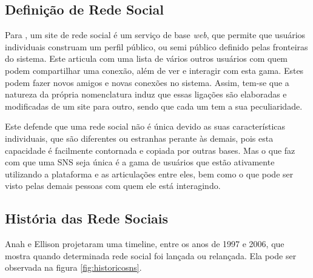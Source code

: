 \subsection{Definição de Rede Social}


\label{sec:definicao}
Para \cite{socialnetworkdefinition}, um site de rede social é um serviço
de base \textit{web}, que permite que usuários individuais construam um perfil público, ou
semi público definido pelas fronteiras do sistema. Este articula com uma lista de
vários outros usuários com quem podem compartilhar uma conexão, além de ver e
interagir com esta gama. Estes podem fazer novos amigos e novas conexões no sistema.
Assim, tem-se que a natureza da própria nomenclatura induz que essas ligações
são elaboradas e modificadas de um site para outro, sendo que cada um tem a sua
peculiaridade.

Este defende que uma rede social não é única devido as suas características individuais,
que são diferentes ou estranhas perante às demais, pois esta capacidade é facilmente
contornada e copiada por outras bases. Mas o que faz com que uma SNS seja única
é a gama de usuários que estão ativamente utilizando a plataforma e as articulações
entre eles, bem como o que pode ser visto pelas demais pessoas com quem ele está
interagindo.

\subsection{História das Rede Sociais}
\label{sec:historiadasredessociais}
Anah e Ellison projetaram uma timeline, entre os anos de 1997 e 2006, que mostra
quando determinada rede social foi lançada ou relançada. Ela pode ser observada
na figura \ref{fig:historicosns}.

